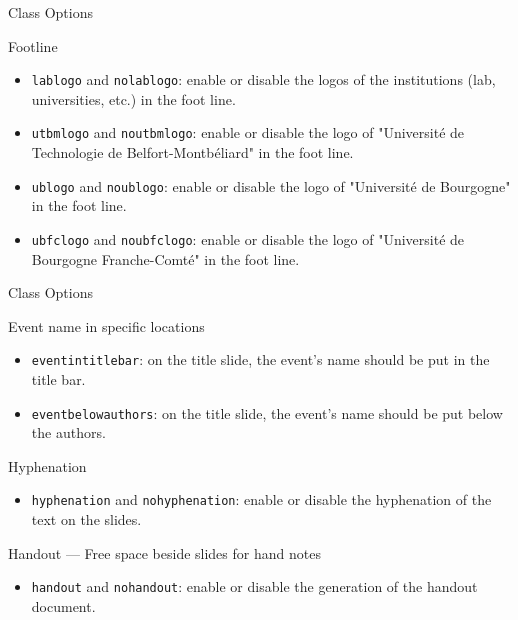 \documentclass[english,sectioncirclenumberstyle]{ciadbeamer}
\begin{document}
\begin{frame}[t]{Class Options \insertcontinuationtext}
	\begin{block}{Footline}
		\begin{itemize}
		\item \texttt{lablogo} and \texttt{nolablogo}: enable or disable the logos of the institutions (lab, universities, etc.) in the foot line.
		\item \texttt{utbmlogo} and \texttt{noutbmlogo}: enable or disable the logo of "Universit\'e de Technologie de Belfort-Montb\'eliard" in the foot line.
		\item \texttt{ublogo} and \texttt{noublogo}: enable or disable the logo of "Universit\'e de Bourgogne" in the foot line.
		\item \texttt{ubfclogo} and \texttt{noubfclogo}: enable or disable the logo of "Universit\'e de Bourgogne Franche-Comt\'e" in the foot line.
		\end{itemize}
	\end{block}
\end{frame}

\begin{frame}[t]{Class Options \insertcontinuationtext}
	\begin{block}{Event name in specific locations}
		\begin{itemize}
		\item \texttt{eventintitlebar}: on the title slide, the event's name should be put in the title bar.
		\item \texttt{eventbelowauthors}: on the title slide, the event's name should be put below the authors.
		\end{itemize}
	\end{block}
	\begin{block}{Hyphenation}
		\begin{itemize}
		\item \texttt{hyphenation} and \texttt{nohyphenation}: enable or disable the hyphenation of the text on the slides.
		\end{itemize}
	\end{block}
	\begin{block}{Handout --- Free space beside slides for hand notes}
		\begin{itemize}
		\item \texttt{handout} and \texttt{nohandout}: enable or disable the generation of the handout document.
		\end{itemize}
	\end{block}
\end{frame}
\end{document}
